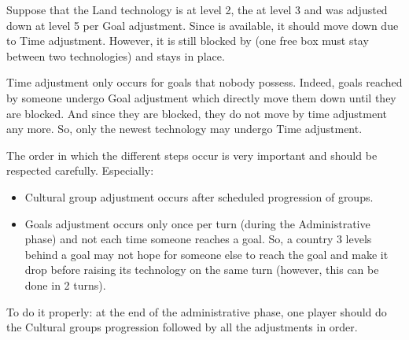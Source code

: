 \begin{exemple}
  Suppose that the \ROTW Land technology is at level 2, the \TREN at level 3
  and \TARQ was adjusted down at level 5 per Goal adjustment. Since \TARQ is
  available, it should move down due to Time adjustment. However, it is still
  blocked by \TREN (one free box must stay between two technologies) and stays
  in place.
\end{exemple}

\begin{playtip}
  Time adjustment only occurs for goals that nobody possess. Indeed, goals
  reached by someone undergo Goal adjustment which directly move them down
  until they are blocked. And since they are blocked, they do not move by time
  adjustment any more. So, only the newest technology may undergo Time
  adjustment.
\end{playtip}

\begin{designnote}
  The order in which the different steps occur is very important and should be
  respected carefully. Especially:
  \begin{itemize}
  \item Cultural group adjustment occurs after scheduled progression of
    groups.
  \item Goals adjustment occurs only once per turn (during the Administrative
    phase) and not each time someone reaches a goal. So, a country 3 levels
    behind a goal may not hope for someone else to reach the goal and make it
    drop before raising its technology on the same turn (however, this can be
    done in 2 turns).
  \end{itemize}

  To do it properly: at the end of the administrative phase, one player should
  do the Cultural groups progression followed by all the adjustments in order.
\end{designnote}


